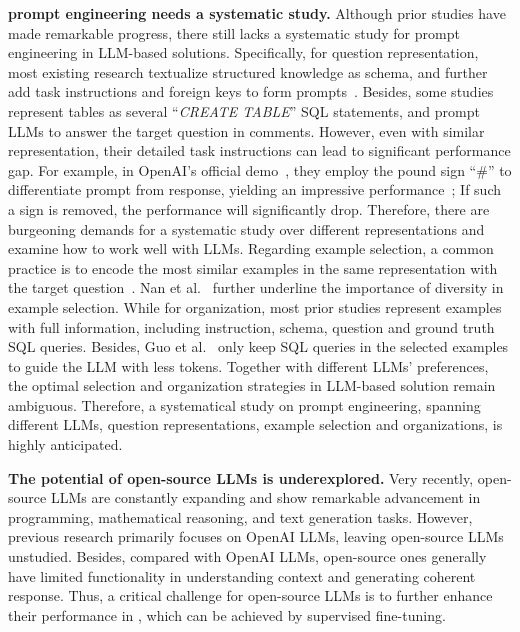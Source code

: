 \textbf{\nlsql prompt engineering needs a systematic study.} 
Although prior studies have made remarkable progress, there still lacks a systematic study for prompt engineering in LLM-based \nlsql solutions. 
Specifically, for question representation, most existing research textualize structured knowledge as schema, and further add task instructions and foreign keys to form prompts~\cite{DBLP:journals/corr/abs-2305-01598, enhancing}. 
Besides, some studies~\cite{enhancing, DBLP:journals/corr/abs-2305-11853} represent tables as several ``\textit{CREATE TABLE}'' SQL statements, and prompt LLMs to answer the target question in comments. 
However, even with similar representation, their detailed task instructions can lead to significant performance gap. 
For example, in OpenAI's official \nlsql demo~\cite{openaiprompt}, they employ the pound sign ``$\#$'' to differentiate prompt from response, yielding an impressive performance~\cite{DBLP:journals/corr/abs-2303-13547}; If such a sign is removed, the performance will significantly drop.
Therefore, there are burgeoning demands for a systematic study over different representations and examine how to work well with LLMs. 
Regarding example selection, a common practice is to encode the most similar examples in the same representation with the target question~\cite{enhancing, DBLP:journals/corr/abs-2305-11853, DBLP:journals/corr/abs-2303-13547}. 
Nan et al.~\cite{enhancing} further underline the importance of diversity in example selection. 
While for organization, most prior studies represent examples with full information, including instruction, schema, question and ground truth SQL queries. 
Besides, Guo et al.~\cite{DBLP:journals/corr/abs-2304-13301} only keep SQL queries in the selected examples to guide the LLM with less tokens. 
Together with different LLMs' preferences, the optimal selection and organization strategies in LLM-based \nlsql solution remain ambiguous.  
Therefore, a systematical study on prompt engineering, spanning different LLMs, question representations, example selection and organizations, is highly anticipated. 

\textbf{The potential of open-source LLMs is underexplored.} 
Very recently, open-source LLMs are constantly expanding and show remarkable advancement in programming, mathematical reasoning, and text generation tasks. 
However, previous \nlsql research primarily focuses on OpenAI LLMs, leaving open-source LLMs unstudied. 
Besides, compared with OpenAI LLMs, open-source ones generally have limited functionality in understanding context and generating coherent response. 
Thus, a critical challenge for open-source LLMs is to further enhance their performance in \nlsql, which can be achieved by supervised fine-tuning. 


